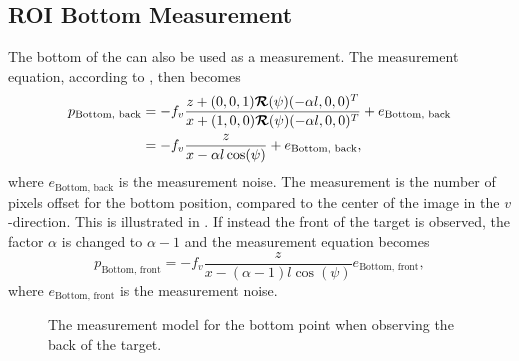 \newpage

\subsection{ROI Bottom Measurement}

The bottom of the \abbrROI can also be used as a measurement.
The measurement equation, according to , then becomes
%
\begin{equation}
\begin{split}
    p_{\text{Bottom, back}} &= -f_v \frac{z + (0,0,1) \bm{\mathcal{R}}(\psi) (- \alpha l,0,0)^T}{x + (1,0,0) \bm{\mathcal{R}}(\psi) (- \alpha l,0,0)^T} + e_{\text{Bottom, back}} \\
    &= -f_v \frac{z}{x - \alpha l \cos(\psi)} + e_{\text{Bottom, back}},
\end{split}
\end{equation}
%
where $e_{\text{Bottom, back}}$ is the measurement noise.
The measurement is the number of pixels offset for the bottom position, compared to the center of the image in the $v$-direction.
This is illustrated in .
If instead the front of the target is observed, the factor $\alpha$ is changed to $\alpha-1$ and the measurement equation becomes
%
\begin{equation}
    p_{\text{Bottom, front}} =  -f_v \frac{z}{x - (\alpha - 1) l \cos(\psi)} e_{\text{Bottom, front}},
\end{equation}
where $e_{\text{Bottom, front}}$ is the measurement noise.

\begin{figure}[!ht]
    \centering
    \caption{\label{fig:measurementmodelbottom} The measurement model for the \abbrROI bottom point when observing the back of the target.}
\end{figure}

